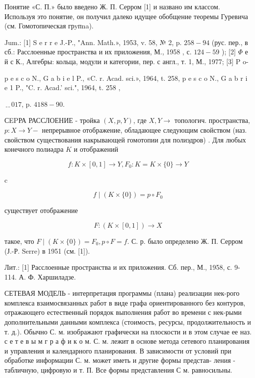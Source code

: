 \documentclass[10pt]{article}
\begin{document}
Понятие «С. П.» было введено Ж. П. Серром [1] и названо им классом. Используя это понятие, он получил далеко идущее обобщение теоремы Гуревича (см. Гомотопическая грyпna).



Jum.: [1] S e r r e J.-P., "Ann. Math.», 1953, v. 58, № 2, p. $258-94$ (рус. пер., в сб.: Расслоенные пространства и их приложения, М., 1958 , с. $124-59$ ); [2] $\Phi$ е й с К., Алгебры: кольца, модули и категории, пер. с англ., т. 1, М., 1977; [3] P o-

p e s c o N., G a b i e l P., «C. r. Acad. sci.», 1964, t. 258, p e s c o N., G a b r i e 1 P., "C. r. Acad.' sci.", 1964, t. 258 ,

$﹎{0} 17$, p. $4188-90$.



СEPРА РАССЛОЕНИЕ - тройка $(X, p, Y)$, где $X, Y \rightarrow$ топологич. пространства, $p: X \rightarrow Y-$ непрерывное отображение, обладающее следующим свойством (наз. свойством существования накрывающей гомотопии для полиэдров) . Для любых конечного полиәдра $K$ и отображений



\[

f: K \times[0,1] \rightarrow Y, F_{0}: K=K \times\{0\} \rightarrow Y

\]



c



\[

f \mid(K \times\{0\})=p \circ F_{0}

\]



существует отображение



\[

F:(K \times[0,1]) \rightarrow X

\]



такое, что $F \mid(K \times\{0\})=F_{0}, p \circ F=f$. С. р. было определено Ж. П. Серром (Ј.-Р. Serre) в 1951 (см. [1]).



Лит.: [1] Расслоенные пространства и их приложения. Сб. пер., М., 1958, с. 9-114. А. Ф. Харшиладзе.



СЕТЕВАЯ МОДЕЛЬ - интерпретация программы (плана) реализации нек-рого комплекса взаимосвязанных работ в виде графа ориентированного без контуров, отражающего естественный порядок выполнения работ во времени с нек-рыми дополнительными данными комплекса (стоимость, ресурсы, продолжительность и т. д.). Обычно С. м. изображают графически на плоскости и в этом случае ее наз. с е т е в ы м г р а ф и к о м. С. м. лежит в основе метода сетевого планирования и управления и календарного планирования. В зависимости от условий при обработке информации С. м. может иметь и другие формы представ- ления - табличную, цифровую и т. П. Все формы представления С м. равносильны.
\end{document}
